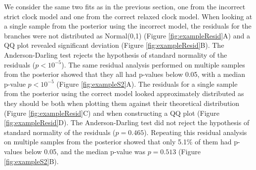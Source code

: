 \documentclass{article}
\begin{document}
We consider the same two fits as in the previous section, one from the incorrect strict clock model
and one from the correct relaxed clock model. 
When looking at a single sample from the posterior using the incorrect model,
the residuals for the branches were not distributed as Normal(0,1) (Figure \ref{fig:exampleResid}A)
and a QQ plot revealed significant deviation (Figure \ref{fig:exampleResid}B). 
The Anderson-Darling test rejects the hypothesis of standard normality of the residuals ($p<10^{-5}$).
The same residual analysis performed on multiple samples from the posterior showed that they all
had p-values below 0.05, with a median p-value $p<10^{-5}$ (Figure \ref{fig:exampleS2}A).
The residuals for a single sample from the posterior using the correct model
looked approximately distributed as they should be both when plotting them against
their theoretical distribution (Figure \ref{fig:exampleResid}C) and when constructing a QQ plot (Figure \ref{fig:exampleResid}D).
The Anderson-Darling test did not reject the hypothesis of standard normality of the residuals ($p=0.465$).
Repeating this residual analysis on multiple samples from the posterior showed that only 5.1\% of 
them had p-values below 0.05, and the median p-value was $p=0.513$ (Figure \ref{fig:exampleS2}B).
\end{document}
